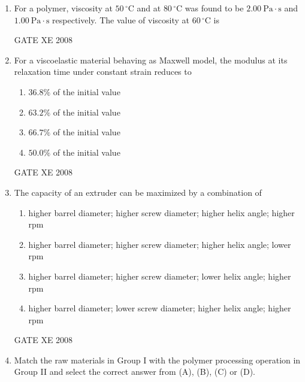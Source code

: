 \documentclass[12pt]{article}
\begin{document}
\begin{enumerate}[label=Q\arabic*.]
\item For a polymer, viscosity at $50\,^{\circ}\mathrm{C}$ and at $80\,^{\circ}\mathrm{C}$ was found to be $2.00~\mathrm{Pa\cdot s}$ and $1.00~\mathrm{Pa\cdot s}$ respectively. The value of viscosity at $60\,^{\circ}\mathrm{C}$ is  

\begin{enumerate}[label=(\Alph*)]
\end{enumerate}

 GATE XE 2008

\item For a viscoelastic material behaving as Maxwell model, the modulus at its relaxation time under constant strain reduces to  

\begin{enumerate}[label=(\Alph*)]
\item  $36.8\%$ of the initial value  
\item  $63.2\%$ of the initial value  
\item  $66.7\%$ of the initial value  
\item  $50.0\%$ of the initial value 
\end{enumerate}

GATE XE 2008

\item The capacity of an extruder can be maximized by a combination of  

\begin{enumerate}[label=(\Alph*)]
\item  higher barrel diameter; higher screw diameter; higher helix angle; higher rpm  
\item  higher barrel diameter; higher screw diameter; higher helix angle; lower rpm 
\item  higher barrel diameter; higher screw diameter; lower helix angle; higher rpm 
\item  higher barrel diameter; lower screw diameter; higher helix angle; higher rpm
\end{enumerate}

GATE XE 2008

\item Match the raw materials in Group I with the polymer processing operation in Group II and select the correct answer from (A), (B), (C) or (D).


\end{enumerate}
\end{document}
